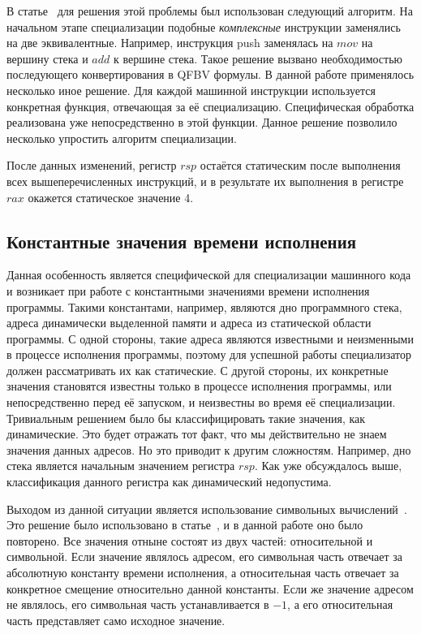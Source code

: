 В статье~\cite{PEMC} для решения этой проблемы был использован следующий алгоритм. На начальном этапе специализации подобные
\emph{комплексные} инструкции заменялись на две эквивалентные.
Например, инструкция push заменялась на $mov$ на вершину стека и $add$ к вершине стека. Такое решение вызвано необходимостью последующего конвертирования в QFBV формулы. В данной работе применялось несколько иное решение. Для каждой машинной инструкции используется конкретная функция, отвечающая за её специализацию. Специфическая обработка реализована уже непосредственно в этой функции. Данное решение позволило несколько упростить алгоритм специализации.

После данных изменений, регистр $rsp$ остаётся статическим после выполнения всех вышеперечисленных инструкций, и в результате их выполнения в регистре $rax$ окажется статическое значение 4.


\subsection{Константные значения времени исполнения}
\label{part:4.3}
Данная особенность является специфической для специализации машинного кода и возникает при работе с константными значениями времени исполнения программы. Такими константами, например, являются дно программного стека, адреса динамически выделенной памяти и адреса из статической области программы. С одной стороны, такие адреса являются известными и неизменными в процессе исполнения программы, поэтому для успешной работы специализатор должен рассматривать их как статические.
С другой стороны, их конкретные значения становятся известны только в процессе исполнения программы, или непосредственно перед её запуском,
и неизвестны во время её специализации.
Тривиальным решением было бы классифицировать такие значения, как динамические. Это будет отражать тот факт, что мы действительно не знаем значения данных адресов. Но это приводит к другим сложностям. Например, дно стека является начальным значением регистра $rsp$. Как уже обсуждалось выше, классификация данного регистра как динамический недопустима. 

Выходом из данной ситуации является использование символьных вычислений~\cite{Sym}. Это решение было использовано в статье~\cite{PEMC}, и в данной работе оно было повторено. Все значения отныне состоят из двух частей: относительной и символьной.
Если значение являлось адресом, его символьная часть отвечает за абсолютную константу времени исполнения,
а относительная часть отвечает за конкретное смещение относительно данной константы.
Если же значение адресом не являлось, его символьная часть устанавливается в $-1$,
а его относительная часть представляет само исходное значение.

